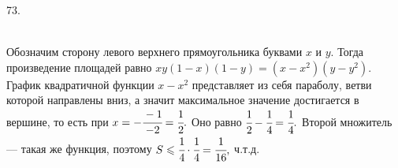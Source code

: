 73. \begin{figure}[ht!]
\end{figure}\\
Обозначим сторону левого верхнего прямоугольника буквами $x$ и $y.$ Тогда произведение площадей равно $xy(1-x)(1-y)=(x-x^2)(y-y^2).$ График квадратичной функции $x-x^2$ представляет из себя параболу, ветви которой направлены вниз, а значит максимальное значение достигается в вершине, то есть при $x=-\cfrac{-1}{-2}=\cfrac{1}{2}.$ Оно равно $\cfrac{1}{2}-\cfrac{1}{4}=\cfrac{1}{4}.$ Второй множитель --- такая же функция, поэтому $S\leqslant \cfrac{1}{4}\cdot \cfrac{1}{4}=\cfrac{1}{16},$ ч.т.д.\\
